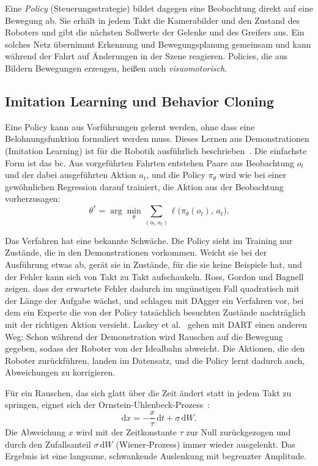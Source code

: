 Eine \emph{Policy} (Steuerungsstrategie) bildet dagegen eine Beobachtung direkt auf eine
Bewegung ab. Sie erhält in jedem Takt die Kamerabilder und den Zustand des Roboters und gibt
die nächsten Sollwerte der Gelenke und des Greifers aus. Ein solches Netz übernimmt
Erkennung und Bewegungsplanung gemeinsam und kann während der Fahrt auf Änderungen in der
Szene reagieren. Policies, die aus Bildern Bewegungen erzeugen, heißen auch
\emph{visuomotorisch}.

\subsection{Imitation Learning und Behavior Cloning}
\label{sec:bc-grundlagen}

Eine Policy kann aus Vorführungen gelernt werden, ohne dass eine Belohnungsfunktion
formuliert werden muss. Dieses Lernen aus Demonstrationen (Imitation Learning) ist für die
Robotik ausführlich beschrieben~\cite{argall2009,osa2018}. Die einfachste Form ist das
\ac{bc}. Aus vorgeführten Fahrten entstehen Paare aus Beobachtung $o_t$ und der dabei
ausgeführten Aktion $a_t$, und die Policy $\pi_\theta$ wird wie bei einer gewöhnlichen
Regression darauf trainiert, die Aktion aus der Beobachtung vorherzusagen:
\begin{equation}
  \theta^{*} = \arg\min_{\theta} \sum_{(o_t, a_t)} \ell\bigl(\pi_\theta(o_t),\, a_t\bigr) .
  \label{eq:bc}
\end{equation}

Das Verfahren hat eine bekannte Schwäche. Die Policy sieht im Training nur Zustände, die
in den Demonstrationen vorkommen. Weicht sie bei der Ausführung etwas ab, gerät sie in
Zustände, für die sie keine Beispiele hat, und der Fehler kann sich von Takt zu Takt
aufschaukeln. Ross, Gordon und Bagnell~\cite{ross2011} zeigen, dass der erwartete Fehler
dadurch im ungünstigen Fall quadratisch mit der Länge der Aufgabe wächst, und schlagen mit
DAgger ein Verfahren vor, bei dem ein Experte die von der Policy tatsächlich besuchten
Zustände nachträglich mit der richtigen Aktion versieht. Laskey et al.~\cite{laskey2017}
gehen mit DART einen anderen Weg: Schon während der Demonstration wird Rauschen auf die
Bewegung gegeben, sodass der Roboter von der Idealbahn abweicht. Die Aktionen, die den
Roboter zurückführen, landen im Datensatz, und die Policy lernt dadurch auch, Abweichungen
zu korrigieren.

Für ein Rauschen, das sich glatt über die Zeit ändert statt in jedem Takt zu springen,
eignet sich der Ornstein-Uhlenbeck-Prozess~\cite{uhlenbeck1930}:
\begin{equation}
  \mathrm{d}x = -\frac{x}{\tau}\,\mathrm{d}t + \sigma\,\mathrm{d}W .
  \label{eq:ou}
\end{equation}
Die Abweichung $x$ wird mit der Zeitkonstante $\tau$ zur Null zurückgezogen und durch den
Zufallsanteil $\sigma\,\mathrm{d}W$ (Wiener-Prozess) immer wieder ausgelenkt. Das Ergebnis
ist eine langsame, schwankende Auslenkung mit begrenzter Amplitude.

